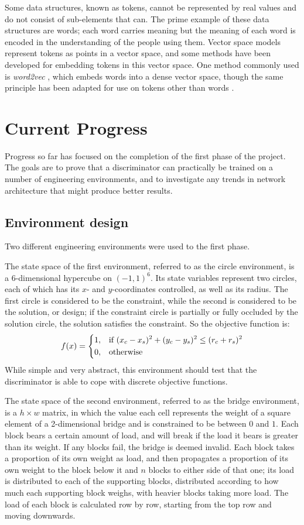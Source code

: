 \documentclass[a4paper]{article}
\begin{document}
Some data structures, known as tokens, cannot be represented by real values and do not consist of sub-elements that can.
The prime example of these data structures are words; each word carries meaning but the meaning of each word is encoded in the understanding of the people using them.
Vector space models represent tokens as points in a vector space, and some methods have been developed for embedding tokens in this vector space.
One method commonly used is \emph{word2vec} \cite{mikolov13}, which embeds words into a dense vector space, though the same principle
has been adapted for use on tokens other than words \cite{le14}.

\section{Current Progress}

Progress so far has focused on the completion of the first phase of the project.
The goals are to prove that a discriminator can practically be trained on a number of engineering environments,
and to investigate any trends in network architecture that might produce better results.

\subsection{Environment design}

Two different engineering environments were used to the first phase.

The state space of the first environment, referred to as the circle environment, is a 6-dimensional hypercube on $(-1, 1)^6$.
Its state variables represent two circles, each of which has its $x$- and $y$-coordinates controlled, as well as its radius.
The first circle is considered to be the constraint, while the second is considered to be the solution, or design;
if the constraint circle is partially or fully occluded by the solution circle, the solution satisfies the constraint.
So the objective function is:
\[
  f(x)= 
\begin{dcases}
  1, & \text{if } (x_c - x_s)^2 + (y_c - y_s)^2 \leq (r_c + r_s)^2\\
  0, & \text{otherwise}
\end{dcases}
\]
While simple and very abstract, this environment should test that the discriminator is able to cope with discrete objective functions.

The state space of the second environment, referred to as the bridge environment, is a $h \times w$ matrix,
in which the value each cell represents the weight of a square element of a 2-dimensional bridge and is constrained to be between $0$ and $1$.
Each block bears a certain amount of load, and will break if the load it bears is greater than its weight.
If any blocks fail, the bridge is deemed invalid.
Each block takes a proportion of its own weight as load, and then propagates a proportion of its own weight to the block below it and $n$ blocks to either side of that one;
its load is distributed to each of the supporting blocks, distributed according to how much each supporting block weighs, with heavier blocks taking more load.
The load of each block is calculated row by row, starting from the top row and moving downwards.
\end{document}
